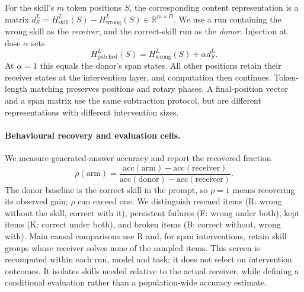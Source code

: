 \documentclass{article}
\newcommand{\dvec}{\ensuremath{d}}
\begin{document}
For the skill's $m$ token positions $S$, the corresponding content representation
is a matrix $\dvec_S^L=H^L_{\mathrm{skill}}(S)-H^L_{\mathrm{wrong}}(S)
\in\mathbb{R}^{m\times D}$. We use a run containing the wrong skill as the
\emph{receiver}, and the correct-skill run as the \emph{donor}. Injection at dose
$\alpha$ sets
\begin{equation}
H^L_{\mathrm{patched}}(S)=H^L_{\mathrm{wrong}}(S)+\alpha\dvec_S^L.
\label{eq:inject}
\end{equation}
At $\alpha=1$ this equals the donor's span states. All other positions retain
their receiver states at the intervention layer, and computation then continues.
Token-length matching preserves positions and rotary phases. A final-position
vector and a span matrix use the same subtraction protocol, but are different
representations with different intervention sizes.

\paragraph{Behavioural recovery and evaluation cells.}
We measure generated-answer accuracy and report the recovered fraction
\begin{equation}
\rho(\mathrm{arm})=
\frac{\mathrm{acc}(\mathrm{arm})-\mathrm{acc}(\mathrm{receiver})}
     {\mathrm{acc}(\mathrm{donor})-\mathrm{acc}(\mathrm{receiver})}.
\label{eq:rho}
\end{equation}
The donor baseline is the correct skill in the prompt, so $\rho=1$ means
recovering its observed gain; $\rho$ can exceed one. We distinguish rescued
items (R: wrong without the skill, correct with it), persistent failures (F:
wrong under both), kept items (K: correct under both), and broken items (B:
correct without, wrong with). Main causal comparisons use R and, for span
interventions, retain skill groups whose receiver solves none of the sampled
items. This screen is recomputed within each run, model and task; it does not
select on intervention outcomes. It isolates skills needed relative to the
actual receiver, while defining a conditional evaluation rather than a
population-wide accuracy estimate.
\end{document}
